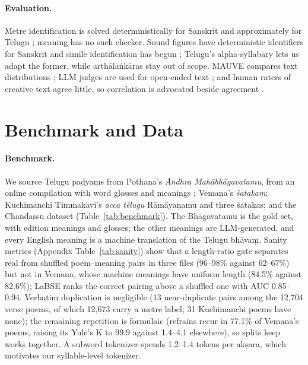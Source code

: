 \documentclass[11pt]{article}
\begin{document}
\paragraph{Evaluation.} Metre identification is solved deterministically for Sanskrit \citep{terdalkar2023}
and approximately for Telugu \citep{boddu2025chandassu}; meaning has no such checker. Sound figures have
deterministic identifiers for Sanskrit \citep{barbadikar2023yamaka,barbadikar2024anuprasa} and simile
identification has begun \citep{jadhav2025upama}; Telugu's alpha-syllabary lets us adapt the former, while
arthālaṅkāras stay out of scope. MAUVE compares text distributions \citep{pillutla2021mauve}; LLM judges
are used for open-ended text \citep{zheng2023judge,liu2023geval}; and human raters of creative text agree
little, so correlation is advocated beside agreement \citep{amidei2019agreement,karpinska2021perils}.

\section{Benchmark and Data}\label{sec:data}

\paragraph{Benchmark.} We source Telugu padyaṃs from Pothana's \textit{Āndhra Mahābhāgavatamu}, from an online
compilation with word glosses and meanings \citep{pothana15c}; Vemana's \textit{śatakaṃ}; Kuchimanchi
Timmakavi's \textit{acca tĕlugu} Rāmāyaṇamu and three śatakas; and the Chandassu dataset
\citep{boddu2025chandassu,boddu2025kaggle} (Table~\ref{tab:benchmark}). The Bhāgavatamu is the gold set,
with edition meanings and glosses; the other meanings are LLM-generated, and every English meaning is a
machine translation of the Telugu bhāvaṃ. Sanity metrics (Appendix Table~\ref{tab:sanity}) show that a
length-ratio gate separates real from shuffled poem--meaning pairs in three files (96--98\% against
62--67\%) but not in Vemana, whose machine meanings have uniform length (84.5\% against 82.6\%); LaBSE
\citep{feng2022labse} ranks the correct pairing above a shuffled one with AUC 0.85--0.94. Verbatim
duplication is negligible (13 near-duplicate pairs among the 12,704 verse poems, of which 12,673 carry a metre
label; 31 Kuchimanchi poems have none); the remaining repetition is formulaic
(refrains recur in 77.1\% of Vemana's poems, raising its Yule's K to 99.9 against 1.4--4.1 elsewhere), so
splits keep works together. A subword tokenizer spends 1.2--1.4 tokens per akṣara, which motivates our
syllable-level tokenizer.
\end{document}
